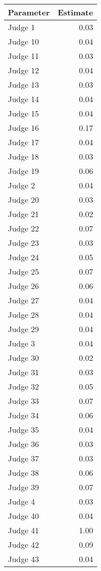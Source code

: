 \begin{tabular}{lr}
\toprule
Parameter &  Estimate \\
\midrule
  Judge 1 &      0.03 \\
 Judge 10 &      0.04 \\
 Judge 11 &      0.03 \\
 Judge 12 &      0.04 \\
 Judge 13 &      0.03 \\
 Judge 14 &      0.04 \\
 Judge 15 &      0.04 \\
 Judge 16 &      0.17 \\
 Judge 17 &      0.04 \\
 Judge 18 &      0.03 \\
 Judge 19 &      0.06 \\
  Judge 2 &      0.04 \\
 Judge 20 &      0.03 \\
 Judge 21 &      0.02 \\
 Judge 22 &      0.07 \\
 Judge 23 &      0.03 \\
 Judge 24 &      0.05 \\
 Judge 25 &      0.07 \\
 Judge 26 &      0.06 \\
 Judge 27 &      0.04 \\
 Judge 28 &      0.04 \\
 Judge 29 &      0.04 \\
  Judge 3 &      0.04 \\
 Judge 30 &      0.02 \\
 Judge 31 &      0.03 \\
 Judge 32 &      0.05 \\
 Judge 33 &      0.07 \\
 Judge 34 &      0.06 \\
 Judge 35 &      0.04 \\
 Judge 36 &      0.03 \\
 Judge 37 &      0.03 \\
 Judge 38 &      0.06 \\
 Judge 39 &      0.07 \\
  Judge 4 &      0.03 \\
 Judge 40 &      0.04 \\
 Judge 41 &      1.00 \\
 Judge 42 &      0.09 \\
 Judge 43 &      0.04 \\

\end{tabular}

